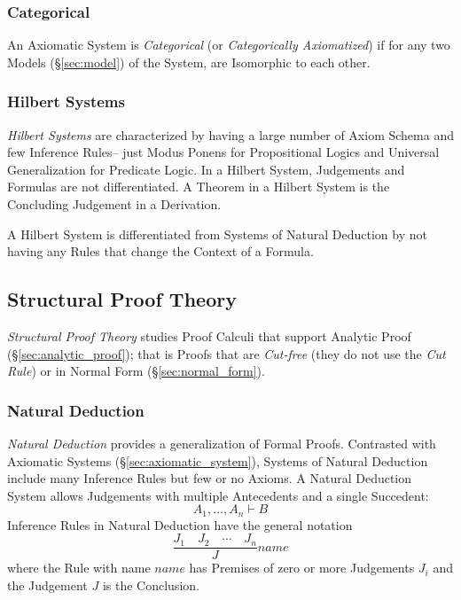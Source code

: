 \subsubsection{Categorical}\label{sec:categorical}

An Axiomatic System is \emph{Categorical} (or \emph{Categorically
  Axiomatized}) if for any two Models (\S\ref{sec:model}) of the
System, are Isomorphic to each other.



\subsubsection{Hilbert Systems}\label{sec:hilbert_system}

\emph{Hilbert Systems} are characterized by having a large number of
Axiom Schema and few Inference Rules-- just Modus Ponens for
Propositional Logics and Universal Generalization for Predicate
Logic. In a Hilbert System, Judgements and Formulas are not
differentiated. A Theorem in a Hilbert System is the Concluding
Judgement in a Derivation.

A Hilbert System is differentiated from Systems of Natural Deduction
by not having any Rules that change the Context of a Formula.



\subsection{Structural Proof Theory}\label{sec:structural_proof}

\emph{Structural Proof Theory} studies Proof Calculi that support
Analytic Proof (\S\ref{sec:analytic_proof}); that is Proofs that are
\emph{Cut-free} (they do not use the \emph{Cut Rule}) or in Normal
Form (\S\ref{sec:normal_form}).



\subsubsection{Natural Deduction}\label{sec:natural_deduction}
\cite{prawitz65}

\emph{Natural Deduction} provides a generalization of Formal Proofs.
Contrasted with Axiomatic Systems (\S\ref{sec:axiomatic_system}),
Systems of Natural Deduction include many Inference Rules but few or
no Axioms. A Natural Deduction System allows Judgements with multiple
Antecedents and a single Succedent:
\[
  A_1,\ldots,A_n \vdash B
\]
Inference Rules in Natural Deduction have the general notation
\[
  {
    \frac{J_1 \quad J_2 \quad \cdots \quad J_n}
    {J}
  } name
\]
where the Rule with name $name$ has Premises of zero or more
Judgements $J_i$ and the Judgement $J$ is the Conclusion.

